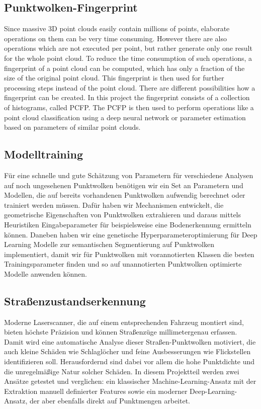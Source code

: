 \subsection{Punktwolken-Fingerprint}

Since massive 3D point clouds easily contain millions of points, elaborate operations on them can be very time consuming. However there are also operations which are not executed per point, but rather generate only one result for the whole point cloud. To reduce the time consumption of such operations, a fingerprint of a point cloud can be computed, which has only a fraction of the size of the original point cloud. This fingerprint is then used for further processing steps instead of the point cloud. There are different possibilities how a fingerprint can be created. In this project the fingerprint consists of a collection of histograms, called PCFP. The PCFP is then used to perform operations like a point cloud classification using a deep neural network or parameter estimation based on parameters of similar point clouds.

\subsection{Modelltraining}

Für eine schnelle und gute Schätzung von Parametern für verschiedene Analysen auf noch ungesehenen Punktwolken benötigen wir ein Set an Parametern und Modellen, die auf bereits vorhandenen Punktwolken aufwendig berechnet oder trainiert werden müssen. Dafür haben wir Mechanismen entwickelt, die geometrische Eigenschaften von Punktwolken extrahieren und daraus mittels Heuristiken Eingabeparameter für beispielsweise eine Bodenerkennung ermitteln können. Daneben haben wir eine genetische Hyperparameteroptimierung für Deep Learning Modelle zur semantischen Segmentierung auf Punktwolken implementiert, damit wir für Punktwolken mit vorannotierten Klassen die besten Trainingsparameter finden und so auf unannotierten Punktwolken optimierte Modelle anwenden können.

\subsection{Straßenzustandserkennung}

Moderne Laserscanner, die auf einem entsprechenden Fahrzeug montiert sind, bieten höchste Präzision und können Straßenzüge millimetergenau erfassen. Damit wird eine automatische Analyse dieser Straßen-Punktwolken motiviert, die auch kleine Schäden wie Schlaglöcher und feine Ausbesserungen wie Flickstellen identifizieren soll. Herausfordernd sind dabei vor allem die hohe Punktdichte und die unregelmäßige Natur solcher Schäden. In diesem Projektteil werden zwei Ansätze getestet und verglichen: ein klassischer Machine-Learning-Ansatz mit der Extraktion manuell definierter Features sowie ein moderner Deep-Learning-Ansatz, der aber ebenfalls direkt auf Punktmengen arbeitet.

